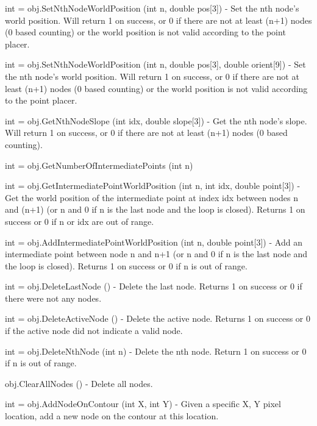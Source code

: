 \begin{DoxyItemize}
\item {\ttfamily int = obj.\-Set\-Nth\-Node\-World\-Position (int n, double pos\mbox{[}3\mbox{]})} -\/ Set the nth node's world position. Will return 1 on success, or 0 if there are not at least (n+1) nodes (0 based counting) or the world position is not valid according to the point placer.  
\item {\ttfamily int = obj.\-Set\-Nth\-Node\-World\-Position (int n, double pos\mbox{[}3\mbox{]}, double orient\mbox{[}9\mbox{]})} -\/ Set the nth node's world position. Will return 1 on success, or 0 if there are not at least (n+1) nodes (0 based counting) or the world position is not valid according to the point placer.  
\item {\ttfamily int = obj.\-Get\-Nth\-Node\-Slope (int idx, double slope\mbox{[}3\mbox{]})} -\/ Get the nth node's slope. Will return 1 on success, or 0 if there are not at least (n+1) nodes (0 based counting).  
\item {\ttfamily int = obj.\-Get\-Number\-Of\-Intermediate\-Points (int n)}  
\item {\ttfamily int = obj.\-Get\-Intermediate\-Point\-World\-Position (int n, int idx, double point\mbox{[}3\mbox{]})} -\/ Get the world position of the intermediate point at index idx between nodes n and (n+1) (or n and 0 if n is the last node and the loop is closed). Returns 1 on success or 0 if n or idx are out of range.  
\item {\ttfamily int = obj.\-Add\-Intermediate\-Point\-World\-Position (int n, double point\mbox{[}3\mbox{]})} -\/ Add an intermediate point between node n and n+1 (or n and 0 if n is the last node and the loop is closed). Returns 1 on success or 0 if n is out of range.  
\item {\ttfamily int = obj.\-Delete\-Last\-Node ()} -\/ Delete the last node. Returns 1 on success or 0 if there were not any nodes.  
\item {\ttfamily int = obj.\-Delete\-Active\-Node ()} -\/ Delete the active node. Returns 1 on success or 0 if the active node did not indicate a valid node.  
\item {\ttfamily int = obj.\-Delete\-Nth\-Node (int n)} -\/ Delete the nth node. Return 1 on success or 0 if n is out of range.  
\item {\ttfamily obj.\-Clear\-All\-Nodes ()} -\/ Delete all nodes.  
\item {\ttfamily int = obj.\-Add\-Node\-On\-Contour (int X, int Y)} -\/ Given a specific X, Y pixel location, add a new node on the contour at this location.  

\end{DoxyItemize}
